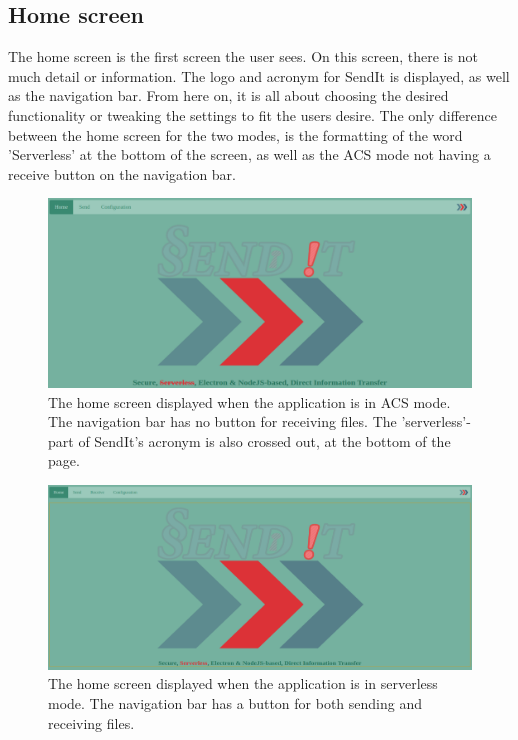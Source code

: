	\subsection{Home screen}
	The home screen is the first screen the user sees. On this screen, there is not much detail or information. The logo and acronym for SendIt is displayed, as well as the navigation bar. From here on, it is all about choosing the desired functionality or tweaking the settings to fit the users desire. The only difference between the home screen for the two modes, is the formatting of the word 'Serverless' at the bottom of the screen, as well as the ACS mode not having a receive button on the navigation bar.
		\begin{figure}[H]
		  \centering
		  \includegraphics[width=\textwidth]{Figures/Base/Home_Screen}
		  \decoRule
		  \caption[Home screen ACS mode]{The home screen displayed when the application is in ACS mode. The navigation bar has no button for receiving files. The 'serverless'-part of SendIt's acronym is also crossed out, at the bottom of the page.}
		  \label{fig:hs_acs}
		\end{figure}

		\begin{figure}[H]
		  \centering
		  \includegraphics[width=\textwidth]{Figures/Base/Home_Screen_SL}
		  \decoRule
		  \caption[Home screen Serverless mode]{The home screen displayed when the application is in serverless mode. The navigation bar has a button for both sending and receiving files.}
		  \label{fig:hs_sl}
		\end{figure}

